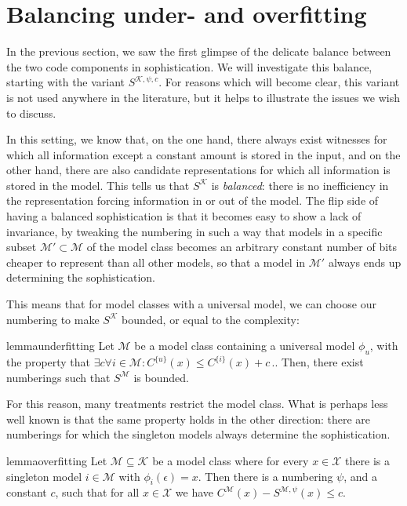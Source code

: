 \documentclass{style/llncs}
\newcommand{\M}{\mathscr M}
\newcommand{\K}{\mathscr K}
\newcommand{\X}{\mathscr X}
\newcommand{\s}{S}
\newcommand{\p}{\,\text{.}}
\begin{document}
\section{Balancing under- and overfitting}
\label{section:balance}

In the previous section, we saw the first glimpse of the delicate balance between the two code components in sophistication. We will investigate this balance, starting with the variant $\s^{\K,\psi,c}$. For reasons which will become clear, this variant is not used anywhere in the literature, but it helps to illustrate the issues we wish to discuss.

In this setting, we know that, on the one hand, there always exist witnesses for which all information except a constant amount is stored in the input, and on the other hand, there are also candidate representations for which all information is stored in the model. This tells us that $S^\K$ is \emph{balanced}: there is no inefficiency in the representation forcing information in or out of the model.
The flip side of having a balanced sophistication is that it becomes easy to show a lack of invariance, by tweaking the numbering in such a way that models in a specific subset $\M'\subset\M$ of the model class becomes an arbitrary constant number of bits cheaper to represent than all other models, so that a model in $\M'$ always ends up determining the sophistication.

This means that for model classes with a universal model, we can choose our numbering to make $S^\K$ bounded, or equal to the complexity:

\begin{restatable}[Underfitting]{lemma}{underfitting}
Let $\M$ be a model class containing a universal model $\phi_u$, with the property that $\exists c \forall i \in \M : C^{\{u\}}(x) \leq C^{\{i\}}(x) + c \p$. Then, there exist numberings such that $\s^\M$ is bounded.\label{lemma:underfitting}
\end{restatable}

For this reason, many treatments restrict the model class. What is perhaps less well known is that the same property holds in the other direction: there are numberings for which the singleton models always determine the sophistication. 

\begin{restatable}[Overfitting]{lemma}{overfitting}
Let $\M \subseteq \K$ be a model class where for every $x\in\X$ there is a singleton model $i\in\M$ with $\phi_i(\epsilon)=x$. Then there is a numbering $\psi$, and a constant $c$, such that for all $x\in\X$ we have $C^\M(x)-S^{\M,\psi}(x)\leq c$.\label{lemma:overfitting}
\end{restatable}
\end{document}
